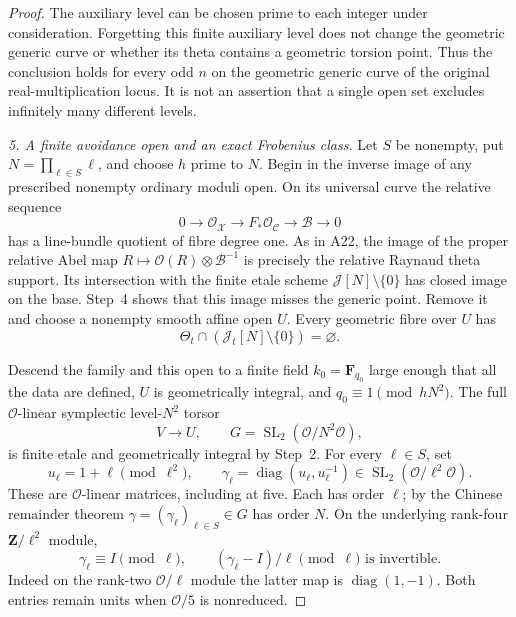 \documentclass[11pt,a4paper]{article}
\begin{document}
\begin{proof}
The auxiliary level can be chosen prime to each integer under
consideration.  Forgetting this finite auxiliary level does not
change the geometric generic curve or whether its theta contains
a geometric torsion point.  Thus the conclusion holds for every
odd $n$ on the geometric generic curve of the original
real-multiplication locus.  It is not an assertion that a
single open set excludes infinitely many different levels.

\emph{5. A finite avoidance open and an exact Frobenius class.}
Let $S$ be nonempty, put $N=\prod_{\ell\in S}\ell$, and choose
$h$ prime to $N$.  Begin in the inverse image of any prescribed
nonempty ordinary moduli open.  On its universal curve the
relative sequence
\[
 0\longrightarrow\mathcal O_{\mathcal X}
 \longrightarrow F_*\mathcal O_{\mathcal C}
 \longrightarrow\mathcal B\longrightarrow0                 \tag{RM.8}
\]
has a line-bundle quotient of fibre degree one.  As in A22,
the image of the proper relative Abel map
$R\mapsto\mathcal O(R)\otimes\mathcal B^{-1}$ is precisely
the relative Raynaud theta support.  Its intersection with
the finite etale scheme $\mathcal J[N]\setminus\{0\}$ has
closed image on the base.  Step~4 shows that this image
misses the generic point.  Remove it and choose a nonempty
smooth affine open $U$.  Every geometric fibre over $U$ has
\[
                         \Theta_t\cap
                    (\mathcal J_t[N]\setminus\{0\})
                              =\varnothing.                  \tag{RM.9}
\]

Descend the family and this open to a finite field
$k_0=\mathbf F_{q_0}$ large enough that all the data are
defined, $U$ is geometrically integral, and
$q_0\equiv1\pmod{hN^2}$.  The full
$\mathcal O$-linear symplectic level-$N^2$ torsor
\[
                      V\longrightarrow U,
 \qquad G=\operatorname{SL}_2(\mathcal O/N^2\mathcal O),         \tag{RM.10}
\]
is finite etale and geometrically integral by Step~2.
For every $\ell\in S$, set
\[
 u_\ell=1+\ell\pmod{\ell^2},\qquad
 \gamma_\ell=
   \operatorname{diag}(u_\ell,u_\ell^{-1})
       \in\operatorname{SL}_2(\mathcal O/\ell^2\mathcal O).
                                                               \tag{RM.11}
\]
These are $\mathcal O$-linear matrices, including at five.
Each has order $\ell$; by the Chinese remainder theorem
$\gamma=(\gamma_\ell)_{\ell\in S}\in G$ has order $N$.
On the underlying rank-four $\mathbf Z/\ell^2$ module,
\[
 \gamma_\ell\equiv I\pmod\ell,
 \qquad (\gamma_\ell-I)/\ell\pmod\ell
             \text{ is invertible}.                          \tag{RM.12}
\]
Indeed on the rank-two $\mathcal O/\ell$ module the latter
map is $\operatorname{diag}(1,-1)$.  Both entries remain
units when $\mathcal O/5$ is nonreduced.


\end{proof}
\end{document}
